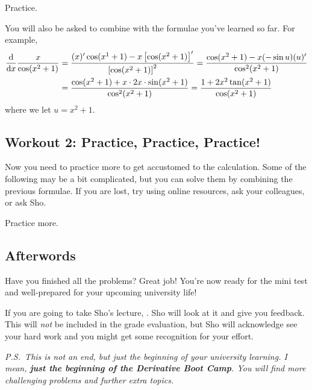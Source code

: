 \documentclass[11pt,pdfa,lastpage]{MishoNote}
\begin{document}
\begin{problems}
  \Problem[S] Practice.
  \begin{menumerate}{3}
  \end{menumerate}
\end{problems}

You will also be asked to combine with the formulae you've learned so far. For example,
  \begin{align*}
  \diff{}{x}\frac{x}{\cos(x^2+1)}
  &= \frac{(x)'\cos(x^1+1)-x\left[\cos(x^2+1)\right]'}{\left[\cos(x^2+1)\right]^2}
  = \frac{\cos(x^2+1)-x(-\sin u)(u)'}{\cos^2(x^2+1)}
  \\&= \frac{\cos(x^2+1)+x\cdot 2x\cdot \sin (x^2+1)}{\cos^2(x^2+1)} = \frac{1+2x^2\tan(x^2+1)}{\cos(x^2+1)}
  \end{align*}
where we let $u=x^2+1$.


\subsection{Workout 2: Practice, Practice, Practice!}
Now you need to practice more to get accustomed to the calculation.
Some of the following may be a bit complicated, but you can solve them by combining the previous formulae.
If you are lost, try using online resources, ask your colleagues, or ask Sho.

\begin{problems}
  \Problem[S] Practice more.
\begin{menumerate}{3}
\end{menumerate}
\end{problems}

\vfill
\subsection*{Afterwords}

Have you finished all the problems? Great job! You're now ready for the mini test and well-prepared for your upcoming university life!

If you are going to take Sho's lecture, .
Sho will look at it and give you feedback. This will \emph{not} be included in the grade evaluation, but Sho will acknowledge see your hard work and you might get some recognition for your effort.


\vfill

\noindent
\emph{P.S.~This is not an end, but just the beginning of your university learning. I mean, \textbf{just the beginning of the Derivative Boot Camp}. You will find more challenging problems and further extra topics.}
\end{document}
